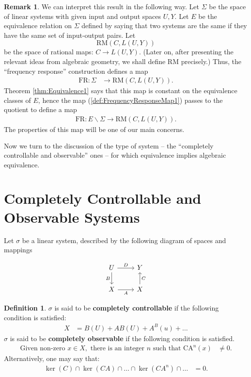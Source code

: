 \documentclass[12pt]{book}
\theoremstyle{plain}
\theoremstyle{definition}
\newtheorem{definition}{Definition}[section]
\newtheorem*{remark}{Remark}
\begin{document}
\begin{remark}
    We can interpret this result in the following way.
    Let $\Sigma$ be the space of linear systems with given input and output spaces $U, Y$.
    Let $E$ be the equivalence relation on $\Sigma$ defined by saying that two systems are the same if they have the same set of input-output pairs.
    Let
    $$\textrm{RM}(C, L(U, Y))$$
    be the space of rational maps: $C \to L(U, Y)$.
    (Later on, after presenting the relevant ideas from algebraic geometry, we shall define $\textrm{RM}$ precisely.)
    Thus, the ``frequency response'' construction defines a map
    \begin{align} \label{def:FrequencyResponseMap1}
        \textrm{FR}: \Sigma &\to \textrm{RM}(C, L(U, Y)).
    \end{align}
    Theorem \ref{thm:Equivalence1} says that this map is constant on the equivalence classes of $E$, hence the map (\ref{def:FrequencyResponseMap1}) passes to the quotient to define a map
    \begin{align}
        \textrm{FR}: E\backslash\Sigma \to \textrm{RM}(C, L(U, Y)).
    \end{align}
    The properties of this map will be one of our main concerns.
\end{remark}

Now we turn to the discussion of the type of system -- the ``completely controllable and observable'' ones -- for which equivalence implies algebraic equivalence.

\section{Completely Controllable and Observable Systems}
Let $\sigma$ be a linear system, described by the following diagram of spaces and mappings

\begin{equation}
\begin{tikzcd} \label{diag:LinearSystem1}
    U \ar[r,"D"] \ar[d,"B"'] & Y \\
    X \ar[r,"A"'] & X \ar[u,"C"']
\end{tikzcd}
\end{equation}

\begin{definition}
    $\sigma$ is said to be \textbf{completely controllable} if the following condition is satisfied:
    \begin{align}
        X &= B(U) + AB(U) + A^B(u) + \dots
    \end{align}
    $\sigma$ is said to be \textbf{completely observable} if the following condition is satisfied.
    \begin{align} \label{eq:CompletelyObservableCondition1}
        \text{Given non-zero } x \in X, \text{ there is an integer } n \text{ such that } \textrm{CA}^n(x) &\neq 0.
    \end{align}
    Alternatively, one may say that:
    \begin{align} \label{eq:CompletelyObservableCondition2}
        \ker(C) \cap \ker(CA) \cap \dots \cap  \ker(CA^n) \cap \dots &= 0.
    \end{align}
\end{definition}
\end{document}

